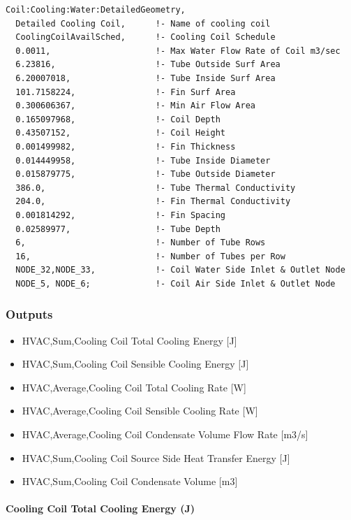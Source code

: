 \begin{lstlisting}
Coil:Cooling:Water:DetailedGeometry,
  Detailed Cooling Coil,      !- Name of cooling coil
  CoolingCoilAvailSched,      !- Cooling Coil Schedule
  0.0011,                     !- Max Water Flow Rate of Coil m3/sec
  6.23816,                    !- Tube Outside Surf Area
  6.20007018,                 !- Tube Inside Surf Area
  101.7158224,                !- Fin Surf Area
  0.300606367,                !- Min Air Flow Area
  0.165097968,                !- Coil Depth
  0.43507152,                 !- Coil Height
  0.001499982,                !- Fin Thickness
  0.014449958,                !- Tube Inside Diameter
  0.015879775,                !- Tube Outside Diameter
  386.0,                      !- Tube Thermal Conductivity
  204.0,                      !- Fin Thermal Conductivity
  0.001814292,                !- Fin Spacing
  0.02589977,                 !- Tube Depth
  6,                          !- Number of Tube Rows
  16,                         !- Number of Tubes per Row
  NODE_32,NODE_33,            !- Coil Water Side Inlet & Outlet Node
  NODE_5, NODE_6;             !- Coil Air Side Inlet & Outlet Node
\end{lstlisting}

\subsubsection{Outputs}\label{outputs-11-002}

\begin{itemize}
\item
  HVAC,Sum,Cooling Coil Total Cooling Energy {[}J{]}
\item
  HVAC,Sum,Cooling Coil Sensible Cooling Energy {[}J{]}
\item
  HVAC,Average,Cooling Coil Total Cooling Rate {[}W{]}
\item
  HVAC,Average,Cooling Coil Sensible Cooling Rate {[}W{]}
\item
  HVAC,Average,Cooling Coil Condensate Volume Flow Rate {[}m3/s{]}
\item
  HVAC,Sum,Cooling Coil Source Side Heat Transfer Energy {[}J{]}
\item
  HVAC,Sum,Cooling Coil Condensate Volume {[}m3{]}
\end{itemize}

\paragraph{Cooling Coil Total Cooling Energy (J)}\label{cooling-coil-total-cooling-energy-j-3}

